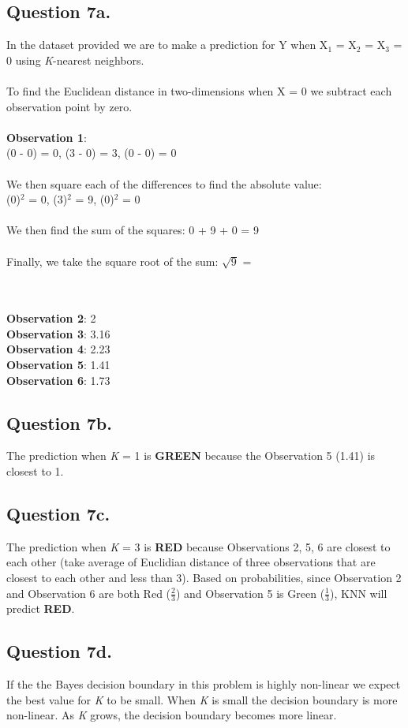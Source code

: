 \documentclass{article}
\begin{document}
\subsection*{Question 7a.}
In the dataset provided we are to make a prediction for Y when X$_{1}$ = X$_{2}$ = X$_{3}$ = 0 using \textit{K}-nearest neighbors. \\ \\
To find the Euclidean distance in two-dimensions when X = 0 we subtract each observation point by zero. \\ \\
\textbf{Observation 1}: \\
(0 - 0) = 0, (3 - 0) = 3, (0 - 0)  = 0 \\ \\
We then square each of the differences to find the absolute value: \\ 
(0)$^{2}$  = 0, (3)$^{2}$ = 9, (0)$^{2}$ = 0 \\ \\
We then find the sum of the squares: 
0 + 9 + 0 = 9 \\ \\
Finally, we take the square root of the sum:
$\sqrt{9}$ = 
\\ \\
\textbf{Observation 2}: 2 \\
\textbf{Observation 3}: 3.16 \\
\textbf{Observation 4}: 2.23 \\
\textbf{Observation 5}: 1.41 \\
\textbf{Observation 6}: 1.73 \\ 

\subsection*{Question 7b.}
The prediction when \textit{K} = 1 is \textbf{GREEN} because the Observation 5 (1.41) is closest to 1. 

\subsection*{Question 7c.} 
The prediction when \textit{K} = 3 is \textbf{RED} because Observations 2, 5, 6 are closest to each other (take average of Euclidian distance of three observations that are closest to each other and less than 3). Based on probabilities, since Observation 2 and Observation 6 are both Red (\(\frac{2}{3}\)) and Observation 5 is Green (\(\frac{1}{3}\)), KNN will predict \textbf{RED}.
\subsection*{Question 7d.}
If the the Bayes decision boundary in this problem is highly non-linear we expect the best value for \textit{K} to be small. When \textit{K} is small the decision boundary is more non-linear. As \textit{K} grows, the decision boundary becomes more linear.
\end{document}
